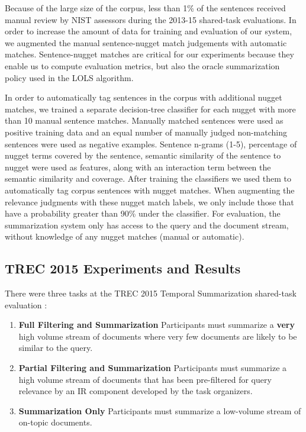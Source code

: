Because of the large size of the corpus, less than 1\% of the sentences
received manual review by NIST assessors during the 2013-15 shared-task
evaluations.  In order to increase the amount of data for training and
evaluation of our system, we augmented the manual sentence-nugget match
judgements with automatic matches.  Sentence-nugget matches are critical for
our experiments because they enable us to compute evaluation metrics, but also
the oracle summarization policy used in the LOLS algorithm.

In order to automatically tag sentences in the corpus with additional nugget
matches, we trained a separate decision-tree classifier for each nugget with
more than 10 manual sentence matches.  Manually matched sentences were used as
positive training data and an equal number of manually judged non-matching
sentences were used as negative examples.  Sentence n-grams (1-5), percentage
of nugget terms covered by the sentence, semantic similarity of the sentence to
nugget were used as features, along with an interaction term between the
semantic similarity and coverage.  After training the classifiers we used them
to automatically tag corpus sentences with nugget matches.  When augmenting the
relevance judgments with these nugget match labels, we only include those that
have a probability greater than 90\% under the classifier.  For evaluation, the
summarization system only has access to the query and the document stream,
without knowledge of any nugget matches (manual or automatic).

\subsection{TREC 2015 Experiments and Results}

There were three tasks at the TREC 2015 Temporal Summarization shared-task
evaluation \citep{aslam2015}:
\begin{enumerate}
\item  \textbf{Full Filtering and Summarization} Participants must summarize
a \textbf{very} high volume stream of documents where very few documents are 
likely to be similar to the query.
\item  \textbf{Partial Filtering and Summarization} Participants must summarize
a high volume stream of documents that has been pre-filtered for query
relevance
by an IR component developed by the task organizers.
\item \textbf{Summarization Only} Participants must summarize a low-volume
stream of on-topic documents.
\end{enumerate}

